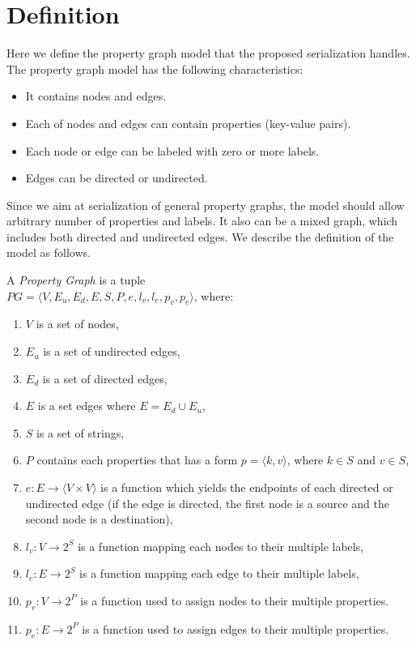 \documentclass[runningheads]{llncs}
\begin{document}
\section{Definition}
Here we define the property graph model that the proposed serialization handles.
The property graph model has the following characteristics:

\begin{itemize}
    \item It contains nodes and edges.
    \item Each of nodes and edges can contain properties (key-value pairs).
    \item Each node or edge can be labeled with zero or more labels.
    \item Edges can be directed or undirected.
\end{itemize}

Since we aim at serialization of general property graphs, the model should allow arbitrary number of properties and labels. It also can be a mixed graph, which includes both directed and undirected edges.
We describe the definition of the model as follows.

\begin{defi}

A \emph{Property Graph} is a tuple  \\ 
$PG = \langle V, E_u, E_d, E, S, P, e, l_v, l_e, p_v, p_e\rangle$, where:
\begin{enumerate}
    \item $V$ is a set of nodes,
    \item $E_u$ is a set of undirected edges,
    \item $E_d$ is a set of directed edges,
    \item $E$ is a set edges where $E = E_d \cup E_u$,
    \item $S$ is a set of strings,
    \item $P$ contains each properties that has a form $p = \langle k,v \rangle$, where $k \in S$ and $v \in S$,
    \item $e: E \to \langle V \times V \rangle$ is a function which yields the endpoints of each directed or undirected edge (if the edge is directed, the first node is a source and the second node is a destination),
    \item $l_v : V \to 2^S$ is a function mapping each nodes to their multiple labels,
    \item $l_e : E \to 2^S$ is a function mapping each edge to their multiple labels,
    \item $p_v : V \to 2^P$ is a function used to assign nodes to their multiple properties.
    \item $p_e : E \to 2^P$ is a function used to assign edges to their multiple properties.
\end{enumerate}
\end{defi}
\end{document}
